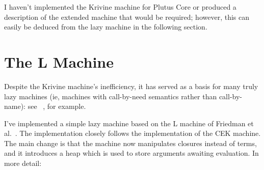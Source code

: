 \documentclass[a4paper]{article}
\begin{document}
I haven't implemented the Krivine machine for Plutus Core or produced
a description of the extended machine that would be required; however,
this can easily be deduced from the lazy machine in the following
section.


\section{The L Machine}
Despite the Krivine machine's inefficiency, it has served as a basis
for many truly lazy machines (ie, machines with call-by-need
semantics rather than call-by-name): see ~\cite{Sestoft, Friedman,
  Douence}, for example.

I've implemented a simple lazy machine based on the L machine of Friedman
et al.~\cite{Friedman}.  The implementation closely follows the
implementation of the CEK machine.  The main change is that the
machine now manipulates closures instead of terms, and it introduces a
heap which is used to store arguments awaiting evaluation.  In more
detail:
\end{document}
